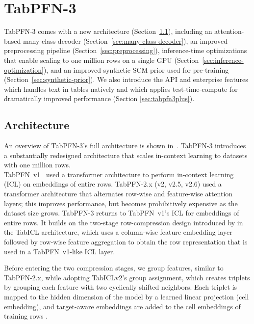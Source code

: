 \section{TabPFN-3}\label{sec:methods}

TabPFN-3 comes with a new architecture (Section~\ref{sec:arch_overview}), including an attention-based many-class decoder (Section~\ref{sec:many-class-decoder}), an improved preprocessing pipeline (Section~\ref{sec:preprocessing}), inference-time optimizations that enable scaling to one million rows on a single GPU (Section~\ref{sec:inference-optimization}), and an improved synthetic SCM prior used for pre-training (Section~\ref{sec:synthetic-prior}). We also introduce the API and enterprise features \ourmodelplus which handles text in tables natively and \ourmodelenhanced which applies test-time-compute for dramatically improved performance (Section \ref{sec:tabpfn3plus}).

\subsection{Architecture}
\label{sec:arch_overview}

An overview of TabPFN-3's full architecture is shown in~. 
TabPFN-3 introduces a substantially redesigned architecture that scales in-context learning to datasets with one million rows.
\\

TabPFN~v1~\citep{hollmann2022tabpfnv1} used a transformer architecture to perform in-context learning (ICL) on embeddings of entire rows.
TabPFN-2.x (v2, v2.5, v2.6) \citep{Hollmann2025tabpfnv2, TabPFN-2.5} used a transformer architecture that alternates row-wise and feature-wise attention layers; this improves performance, but becomes prohibitively expensive as the dataset size grows.
TabPFN-3 returns to TabPFN~v1's ICL for embeddings of entire rows. 
It builds on the two-stage row-compression design introduced by \citet{qu2025tabicl, qu2026tabiclv2} in the TabICL architecture, which uses a column-wise feature embedding layer followed by row-wise feature aggregation to obtain the row representation that is used in a TabPFN~v1-like ICL layer. 


Before entering the two compression stages, we group features, similar to TabPFN-2.x, while adopting TabICLv2's\citep{qu2026tabiclv2} group assignment, which creates triplets by grouping each feature with two cyclically shifted neighbors. Each triplet is mapped to the hidden dimension of the model by a learned linear projection (cell embedding), and target-aware embeddings are added to the cell embeddings of training rows \citep{qu2026tabiclv2}.


